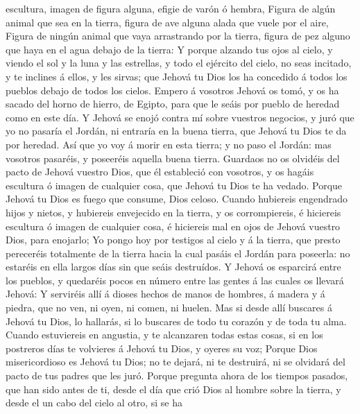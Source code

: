 escultura, imagen de figura alguna, efigie de varón ó hembra,
 Figura de algún animal que sea en la tierra, figura de
ave alguna alada que vuele por el aire,  Figura de ningún
animal que vaya arrastrando por la tierra, figura de pez alguno que haya
en el agua debajo de la tierra:  Y porque alzando tus
ojos al cielo, y viendo el sol y la luna y las estrellas, y todo el
ejército del cielo, no seas incitado, y te inclines á ellos, y les
sirvas; que Jehová tu Dios los ha concedido á todos los pueblos debajo
de todos los cielos.  Empero á vosotros Jehová os tomó, y
os ha sacado del horno de hierro, de Egipto, para que le seáis por
pueblo de heredad como en este día.  Y Jehová se enojó
contra mí sobre vuestros negocios, y juró que yo no pasaría el Jordán,
ni entraría en la buena tierra, que Jehová tu Dios te da por heredad.
 Así que yo voy á morir en esta tierra; y no paso el
Jordán: mas vosotros pasaréis, y poseeréis aquella buena tierra.
 Guardaos no os olvidéis del pacto de Jehová vuestro
Dios, que él estableció con vosotros, y os hagáis escultura ó imagen de
cualquier cosa, que Jehová tu Dios te ha vedado.  Porque
Jehová tu Dios es fuego que consume, Dios celoso.  Cuando
hubiereis engendrado hijos y nietos, y hubiereis envejecido en la
tierra, y os corrompiereis, é hiciereis escultura ó imagen de cualquier
cosa, é hiciereis mal en ojos de Jehová vuestro Dios, para enojarlo;
 Yo pongo hoy por testigos al cielo y á la tierra, que
presto pereceréis totalmente de la tierra hacia la cual pasáis el Jordán
para poseerla: no estaréis en ella largos días sin que seáis destruídos.
 Y Jehová os esparcirá entre los pueblos, y quedaréis
pocos en número entre las gentes á las cuales os llevará Jehová:
 Y serviréis allí á dioses hechos de manos de hombres, á
madera y á piedra, que no ven, ni oyen, ni comen, ni huelen.
 Mas si desde allí buscares á Jehová tu Dios, lo
hallarás, si lo buscares de todo tu corazón y de toda tu alma.
 Cuando estuviereis en angustia, y te alcanzaren todas
estas cosas, si en los postreros días te volvieres á Jehová tu Dios, y
oyeres su voz;  Porque Dios misericordioso es Jehová tu
Dios; no te dejará, ni te destruirá, ni se olvidará del pacto de tus
padres que les juró.  Porque pregunta ahora de los
tiempos pasados, que han sido antes de ti, desde el día que crió Dios al
hombre sobre la tierra, y desde el un cabo del cielo al otro, si se ha

